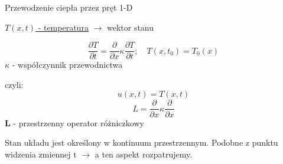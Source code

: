 \begin{frame}{Przewodzenie ciepła przez pręt 1-D}
  \begin{center}
      \underline{$T(x,t)$ - temperatura} $\rightarrow$ \quad wektor stanu \par
  \end{center}
  $$\frac{\partial T}{\partial t} = \frac{\partial}{\partial x}\kappa \frac{\partial T}{\partial t};\quad T(x,t_0) = T_0(x)$$
  $\kappa$ - współczynnik przewodnictwa \par
  czyli: 
  $$u(x,t) = T(x,t)$$
  $$L = \frac{\partial}{\partial x} \kappa \frac{\partial}{\partial x}$$
  \textbf{L} - przestrzenny operator różniczkowy \par
  Stan układu jest określony w kontinuum przestrzennym. Podobne z punktu widzenia zmiennej t $\rightarrow$ a ten aspekt rozpatrujemy.
\end{frame}